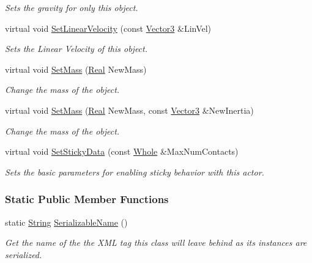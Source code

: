 \begin{DoxyCompactItemize}
\begin{DoxyCompactList}\small\item\em Sets the gravity for only this object. \item\end{DoxyCompactList}\item 
virtual void \hyperlink{classMezzanine_1_1ActorRigidPhysicsSettings_a861a7cf22d838cbbe108cd7daad59e76}{SetLinearVelocity} (const \hyperlink{classMezzanine_1_1Vector3}{Vector3} \&LinVel)
\begin{DoxyCompactList}\small\item\em Sets the Linear Velocity of this object. \item\end{DoxyCompactList}\item 
virtual void \hyperlink{classMezzanine_1_1ActorRigidPhysicsSettings_a9b2ed9808e7b4a7c8874f33c51fb8ca1}{SetMass} (\hyperlink{namespaceMezzanine_a726731b1a7df72bf3583e4a97282c6f6}{Real} NewMass)
\begin{DoxyCompactList}\small\item\em Change the mass of the object. \item\end{DoxyCompactList}\item 
virtual void \hyperlink{classMezzanine_1_1ActorRigidPhysicsSettings_a8c2a5d88f76478a1d1ba4c194ad5d886}{SetMass} (\hyperlink{namespaceMezzanine_a726731b1a7df72bf3583e4a97282c6f6}{Real} NewMass, const \hyperlink{classMezzanine_1_1Vector3}{Vector3} \&NewInertia)
\begin{DoxyCompactList}\small\item\em Change the mass of the object. \item\end{DoxyCompactList}\item 
virtual void \hyperlink{classMezzanine_1_1ActorRigidPhysicsSettings_a2c090930426361a573ba939ac9580bce}{SetStickyData} (const \hyperlink{namespaceMezzanine_adcbb6ce6d1eb4379d109e51171e2e493}{Whole} \&MaxNumContacts)
\begin{DoxyCompactList}\small\item\em Sets the basic parameters for enabling sticky behavior with this actor. \item\end{DoxyCompactList}\end{DoxyCompactItemize}
\subsubsection*{Static Public Member Functions}
\begin{DoxyCompactItemize}
\item 
static \hyperlink{namespaceMezzanine_acf9fcc130e6ebf08e3d8491aebcf1c86}{String} \hyperlink{classMezzanine_1_1ActorRigidPhysicsSettings_a8dab39e71eb26175a3cb4bbb3966c9b1}{SerializableName} ()
\begin{DoxyCompactList}\small\item\em Get the name of the the XML tag this class will leave behind as its instances are serialized. \item\end{DoxyCompactList}\end{DoxyCompactItemize}
